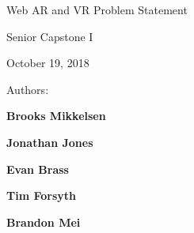 \begin{titlepage}
\label{titlepage}
    \begin{singlespace}
		\hfill  
        \par\vspace{.2in}
        \centering
        \scshape{
            \vspace{.3in}
            \Huge{Web AR and VR Problem Statement}\par  %
            \vspace{.3in}
            \large Senior Capstone I\par
            \vspace{.1in}
            \large October 19, 2018\par
            \vspace{.5in}
            \Large Authors:\par\vspace{.1in} %
            \textbf{\LARGE Brooks Mikkelsen}\par\vspace{.07in}
            \textbf{\LARGE Jonathan Jones}\par\vspace{.07in}
            \textbf{\LARGE Evan Brass}\par\vspace{.07in}
            \textbf{\LARGE Tim Forsyth}\par\vspace{.07in}
            \textbf{\LARGE Brandon Mei}\par\vspace{.07in}
            \vspace{1.4in}
            \par
        }
    \end{singlespace}
    \begin{abstract}
    \label{sec:abstract}
       	\noindent 

\end{abstract}
\end{titlepage}
